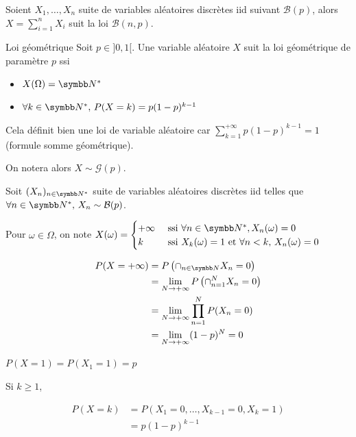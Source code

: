 \begin{remarque}
    Soient $X_1, \dots, X_n$ suite de variables aléatoires discrètes iid suivant $\mathcal B(p)$, 
    alors $\displaystyle X = \sum_{i = 1 }^{ n } X_i$ suit la loi $\mathcal B(n, p)$.
\end{remarque}

\begin{definition}{Loi géométrique}{}
    Soit $p \in ]0, 1[$. Une variable aléatoire $X$ suit la loi géométrique de paramètre $p$ ssi 
    \begin{itemize}
        \item $X(\Omega) = \N^*$
        \item $\forall k \in \N^*, \, P(X = k) = p(1 - p)^{k - 1} $
    \end{itemize}

    Cela définit bien une loi de variable aléatoire car $\displaystyle \sum_{k = 1}^{+ \infty} p(1 - p)^{k - 1} = 1$
    (formule somme géométrique).

    On notera alors $X \sim \mathcal G(p)$.
\end{definition}


\svspace Soit $(X_n)_{n \in \N^*}$ suite de variables aléatoires discrètes iid telles que $\forall n \in \N^*, \, X_n \sim \mathcal B(p)$.

Pour $\omega \in \Omega$, on note $X(\omega) = \begin{cases}
    + \infty & \text{ ssi } \forall n \in \N^*, X_n(\omega) = 0 \\
    k & \text{ ssi } X_k(\omega) = 1 \text{ et } \forall n < k, \, X_n(\omega) = 0
\end{cases}$

\begin{align}
    \displaystyle P(X = + \infty) & = P\left( \cap_{n \in \N} X_n = 0 \right) \\
    & = \lim_{N \to + \infty} P\left( \cap_{n = 1}^N X_n = 0 \right) \\
    & = \lim_{N \to + \infty} \prod_{n = 1 }^{N } P(X_n = 0) \\
    & = \lim_{N \to + \infty} (1 - p)^N = 0
\end{align}

$P(X = 1) = P(X_1 = 1) = p$

Si $k \geqslant 1$, 

\begin{align}
    P(X = k) & = P\left( X_1 = 0, \dots, X_{k - 1} = 0, X_k = 1 \right) \\
    & = p (1 - p)^{k - 1}
\end{align}

